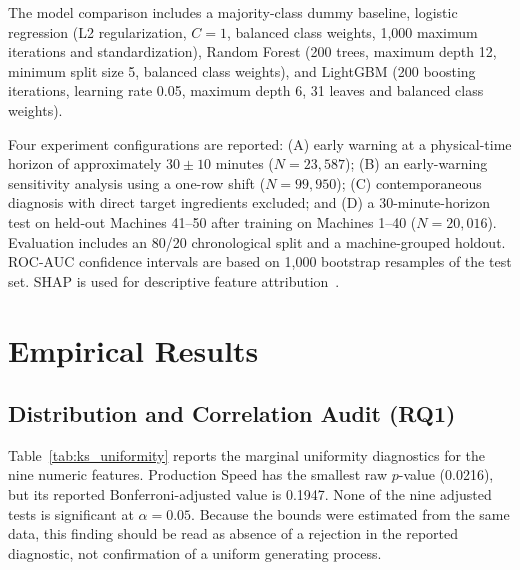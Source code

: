 \documentclass[conference]{IEEEtran}
\begin{document}
The model comparison includes a majority-class dummy baseline, logistic regression (L2 regularization, $C = 1$, balanced class weights, 1,000 maximum iterations and standardization), Random Forest (200 trees, maximum depth 12, minimum split size 5, balanced class weights), and LightGBM (200 boosting iterations, learning rate 0.05, maximum depth 6, 31 leaves and balanced class weights).

Four experiment configurations are reported: (A) early warning at a physical-time horizon of approximately $30 \pm 10$ minutes ($N = 23,587$); (B) an early-warning sensitivity analysis using a one-row shift ($N = 99,950$); (C) contemporaneous diagnosis with direct target ingredients excluded; and (D) a 30-minute-horizon test on held-out Machines 41--50 after training on Machines 1--40 ($N = 20,016$). Evaluation includes an 80/20 chronological split and a machine-grouped holdout. ROC-AUC confidence intervals are based on 1,000 bootstrap resamples of the test set. SHAP is used for descriptive feature attribution~\cite{lundberg2017unified}.

\section{Empirical Results}
\label{sec:results}

\subsection{Distribution and Correlation Audit (RQ1)}
Table~\ref{tab:ks_uniformity} reports the marginal uniformity diagnostics for the nine numeric features. Production Speed has the smallest raw $p$-value (0.0216), but its reported Bonferroni-adjusted value is 0.1947. None of the nine adjusted tests is significant at $\alpha = 0.05$. Because the bounds were estimated from the same data, this finding should be read as absence of a rejection in the reported diagnostic, not confirmation of a uniform generating process.
\end{document}

